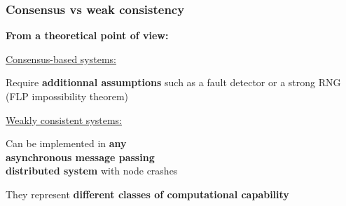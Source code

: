\documentclass[aspectratio=169]{beamer}
\begin{document}
\begin{frame}
	\frametitle{Consensus vs weak consistency}
	\begin{center}
		\textbf{From a theoretical point of view:}\\

	\end{center}
	\vspace{2em}

	\hspace{1em}
	\begin{minipage}{6.5cm}
		\underline{Consensus-based systems:}

		\vspace{1em}

		Require \textbf{additionnal assumptions} such as a fault detector or a strong RNG\\
		(FLP impossibility theorem)
	\end{minipage}
	\hfill
	\begin{minipage}{6.5cm}
		\underline{Weakly consistent systems:}

		\vspace{1em}
		
		Can be implemented in \textbf{any\\asynchronous message passing\\distributed system} with node crashes
	\end{minipage}
	\hspace{1em}

	\vspace{3em}
	\begin{center}
		They represent \textbf{different classes of computational capability}\\
	\end{center}
\end{frame}
\end{document}
